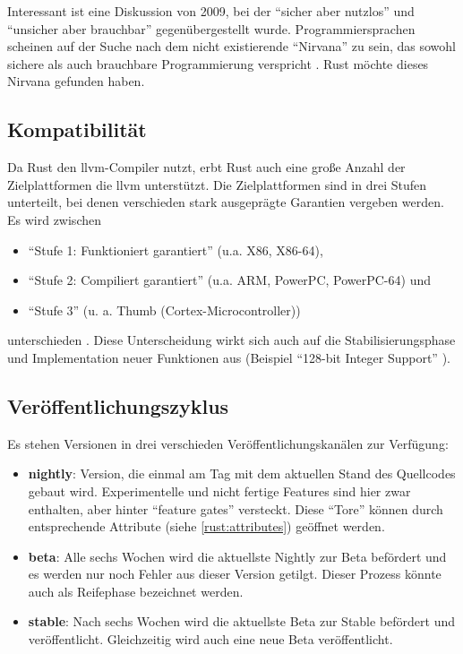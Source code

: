 Interessant ist eine Diskussion von 2009, bei der \enquote{sicher aber nutzlos} und \enquote{unsicher aber brauchbar} gegenübergestellt wurde.
Programmiersprachen scheinen auf der Suche nach dem nicht existierende \enquote{Nirvana} zu sein, das sowohl sichere als auch brauchbare Programmierung verspricht \cite[ab ca Minute 58:20]{rust:infoq:null}.
Rust möchte dieses Nirvana gefunden haben.

\subsection{Kompatibilität}
Da Rust den \gls{llvm}-Compiler nutzt, erbt Rust auch eine große Anzahl der Zielplattformen die \gls{llvm} unterstützt.
Die Zielplattformen sind in drei Stufen unterteilt, bei denen verschieden stark ausgeprägte Garantien vergeben werden. Es wird zwischen
\begin{itemize}
	\item \enquote{Stufe 1: Funktioniert garantiert} (u.a. X86, X86-64),
	\item \enquote{Stufe 2: Compiliert garantiert} (u.a. ARM, PowerPC, PowerPC-64) und
	\item \enquote{Stufe 3} (u. a. Thumb (Cortex-Microcontroller))
\end{itemize}
unterschieden \cite{rust:platform_support}.
Diese Unterscheidung wirkt sich auch auf die Stabilisierungsphase und Implementation neuer Funktionen aus (Beispiel \enquote{128-bit Integer Support} \cite{rust:github:128bit_integer}).

\subsection{Veröffentlichungszyklus}
\label{rust:feature_gates}

Es stehen Versionen in drei verschieden Veröffentlichungskanälen zur Verfügung:
\begin{itemize}
	\item \textbf{nightly}:
	Version, die einmal am Tag mit dem aktuellen Stand des Quellcodes gebaut wird.
	Experimentelle und nicht fertige Features sind hier zwar enthalten, aber hinter \enquote{feature gates} versteckt.
	Diese \enquote{Tore} können durch entsprechende Attribute (siehe \autoref{rust:attributes}) geöffnet werden.%
	
	\item \textbf{beta}: Alle sechs Wochen wird die aktuellste Nightly zur Beta befördert und es werden nur noch Fehler aus dieser Version getilgt.
	Dieser Prozess könnte auch als Reifephase bezeichnet werden.
	\item \textbf{stable}: Nach sechs Wochen wird die aktuellste Beta zur Stable befördert und veröffentlicht.
	Gleichzeitig wird auch eine neue Beta veröffentlicht.
\end{itemize}

